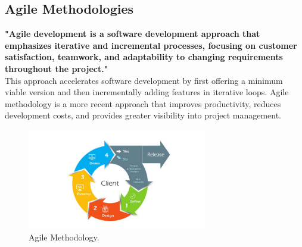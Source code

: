\subsection{ Agile Methodologies}
\textbf{"Agile development is a software development approach that emphasizes iterative and incremental processes, focusing on customer satisfaction, teamwork, and adaptability to changing requirements throughout the project." \cite{somebook}}\\
This approach accelerates software development by first offering a minimum viable version and then incrementally adding features in iterative loops.
Agile methodology is a more recent approach that improves productivity, reduces development costs, and provides greater visibility into project management.
\begin{figure}[htbp]
    \centering
    \includegraphics[width=0.7\textwidth]{figures/agile.jpg} 
    \caption{Agile Methodology.}
\end{figure}\

